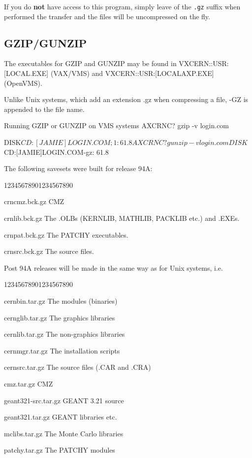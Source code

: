 If you do {\bf not} have access to this program, simply
leave of the {\tt .gz} suffix when performed the transfer
and the files will be uncompressed on the fly.

\subsection{GZIP/GUNZIP}


The executables for GZIP and GUNZIP may be found in
VXCERN::USR:[LOCAL.EXE] (VAX/VMS) and 
VXCERN::USR:[LOCALAXP.EXE] (OpenVMS).

Unlike Unix systems, which add an extension .gz when compressing
a file, -GZ is appended to the file name.

\begin{XMPt}{Running GZIP or GUNZIP on VMS systems}
AXCRNC? gzip -v login.com

DISK$CD:[JAMIE]LOGIN.COM;1:	61.8%

AXCRNC? gunzip -v login.com

DISK$CD:[JAMIE]LOGIN.COM-gz:	61.8%
\end{XMPt}

The following savesets were built for release 94A:

\begin{DLtt}{12345678901234567890}
\item[crncmz.bck.gz]CMZ
\item[crnlib.bck.gz]The .OLBs (KERNLIB, MATHLIB, PACKLIB etc.) and .EXEs.
\item[crnpat.bck.gz]The PATCHY executables.
\item[crnsrc.bck.gz]The source files.
\end{DLtt}

Post 94A releases will be made in the same way as for Unix systems, i.e.

\begin{DLtt}{12345678901234567890}
\item[cernbin.tar.gz]The modules (binaries)
\item[cernglib.tar.gz]The graphics libraries      
\item[cernlib.tar.gz]The non-graphics libraries       
\item[cernmgr.tar.gz]The installation scripts
\item[cernsrc.tar.gz]The source files (.CAR and .CRA)
\item[cmz.tar.gz]CMZ
\item[geant321-src.tar.gz]GEANT 3.21 source
\item[geant321.tar.gz]GEANT libraries etc.
\item[mclibs.tar.gz]The Monte Carlo libraries
\item[patchy.tar.gz]The PATCHY modules
\end{DLtt}

